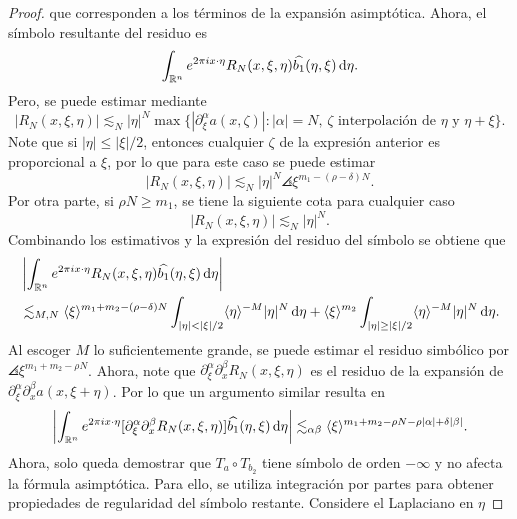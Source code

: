 \begin{proof}
	que corresponden a los términos de la expansión asimptótica. Ahora, el símbolo resultante del residuo es 
	\begin{equation*}
		\int_{\mathbb{R}^n} e^{2\pi i x\cdot\eta} R_N(x, \xi, \eta) \widehat{b_1}(\eta, \xi) \mathop{}\!\mathrm{d} \eta.
	\end{equation*}
	Pero, se puede estimar mediante 
	\begin{equation*}
		|R_N(x, \xi, \eta)| \lesssim_N |\eta|^N \max\{|\partial^\alpha_\xi a(x, \zeta)| : |\alpha|=N,\, \zeta \text{ interpolación de } \eta \text{ y }\eta+\xi\}.
	\end{equation*}
	Note que si $|\eta|\leq|\xi|/2$, entonces cualquier $\zeta$ de la expresión anterior es proporcional a $\xi$, por lo que para este caso se puede estimar
	\begin{equation*}
		|R_N(x, \xi, \eta)| \lesssim_N |\eta|^N\angles{\xi}^{m_1-(\rho-\delta) N}.
	\end{equation*}
	Por otra parte, si $\rho N\geq m_1$, se tiene la siguiente cota para cualquier caso
	\begin{equation*}
		|R_N(x, \xi, \eta)| \lesssim_N |\eta|^N.
	\end{equation*}
	Combinando los estimativos y la expresión del residuo del símbolo se obtiene que 
	\begin{align*}
		&\left| \int_{\R^n} e^{2\pi i x\cdot\eta} R_N(x, \xi, \eta) \widehat{b_1}(\eta, \xi) \diff \eta \right| \\
		&\lesssim_{M,N} \angles{\xi}^{m_1+m_2-(\rho-\delta) N} \int_{|\eta|<|\xi|/2} \angles{\eta}^{-M}|\eta|^N\diff\eta + \angles{\xi}^{m_2} \int_{|\eta|\geq|\xi|/2}\angles{\eta}^{-M}|\eta|^N\diff\eta.
	\end{align*}
	Al escoger $M$ lo suficientemente grande, se puede estimar el residuo simbólico por $\angles{\xi}^{m_1+m_2-\rho N}$. Ahora, note que $\partial^\alpha_\xi\partial^\beta_x R_N(x, \xi, \eta)$ es el residuo de la expansión de $\partial^\alpha_\xi\partial^\beta_x a(x, \xi+\eta)$. Por lo que un argumento similar resulta en 
	\begin{equation*}
		\left|\int_{\mathbb{R}^n} e^{2\pi i x\cdot\eta} [\partial^\alpha_\xi\partial^\beta_x R_N(x, \xi, \eta)]\widehat{b_1}(\eta, \xi) \mathop{}\!\mathrm{d} \eta\right| \lesssim_{\alpha\beta} \langle\xi\rangle^{m_1+m_2- \rho N -\rho|\alpha| + \delta|\beta|}.
	\end{equation*}
	Ahora, solo queda demostrar que $T_a\circ T_{b_2}$ tiene símbolo de orden $-\infty$ y no afecta la fórmula asimptótica. Para ello, se utiliza integración por partes para obtener propiedades de regularidad del símbolo restante. Considere el Laplaciano en $\eta$ 

\end{proof}
